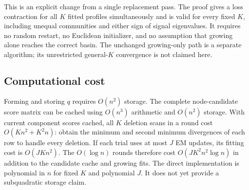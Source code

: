 This is an explicit change from a single replacement pass. The proof gives a loss contraction for all $K$ fitted profiles simultaneously and is valid for every fixed $K$, including unequal communities and either sign of signal eigenvalues. It requires no random restart, no Euclidean initializer, and no assumption that growing alone reaches the correct basin. The unchanged growing-only path is a separate algorithm; its unrestricted general-$K$ convergence is not claimed here.

\subsection{Computational cost}
Forming and storing $q$ requires $O(n^2)$ storage. The complete node-candidate score matrix can be cached using $O(n^3)$ arithmetic and $O(n^2)$ storage. With current component scores cached, all $K$ deletion scans in a round cost $O(Kn^2+K^2n)$: obtain the minimum and second minimum divergences of each row to handle every deletion. If each trial uses at most $J$ EM updates, its fitting cost is $O(JKn^2)$. The $O(\log n)$ rounds therefore cost $O(JK^2n^2\log n)$ in addition to the candidate cache and growing fits. The direct implementation is polynomial in $n$ for fixed $K$ and polynomial $J$. It does not yet provide a subquadratic storage claim.
